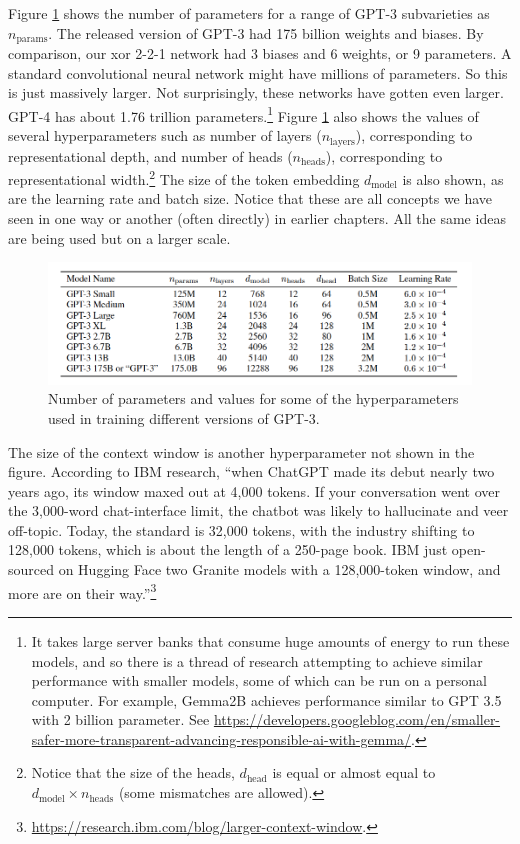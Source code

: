 Figure \ref{gptParams} shows the  number of parameters for a range of GPT-3 subvarieties as $n_\text{params}$. The released version of GPT-3 had 175 billion weights and biases. By comparison, our xor 2-2-1 network had 3 biases and 6 weights, or 9 parameters. A standard convolutional neural network might have millions of parameters. So this is just massively larger. Not surprisingly, these networks have gotten even larger. GPT-4 has about 1.76 trillion parameters.\footnote{It takes large server banks that  consume huge amounts of energy to run these models, and so there is a thread of research attempting to achieve similar performance with smaller models, some of which can be run on a  personal computer. For example, Gemma2B achieves performance similar to GPT 3.5 with 2 billion parameter. See \url{https://developers.googleblog.com/en/smaller-safer-more-transparent-advancing-responsible-ai-with-gemma/}.} Figure \ref{gptParams} also shows the values of several hyperparameters such as number of layers ($n_\text{layers}$), corresponding to representational depth, and number of heads ($n_\text{heads}$), corresponding to representational width.\footnote{Notice that the size of the heads, $d_\text{head}$ is equal or almost equal to  $d_\text{model} \times n_\text{heads}$ (some mismatches are allowed).} The size of the token embedding  $d_\text{model}$ is also shown, as are the learning rate and batch size. Notice that these are all concepts we have seen in one way or another (often directly) in earlier chapters. All the same ideas are being used but on a larger scale.

\begin{figure}[h]
\centering
\includegraphics[scale=.4]{./images/gpt3_params.png}
\caption[\url{https://arxiv.org/abs/2005.14165}.]{Number of parameters and values for some of the hyperparameters used in training different versions of GPT-3. }
\label{gptParams}
\end{figure}

The size of the context window is another hyperparameter not shown in the figure. According to IBM research, ``when ChatGPT made its debut nearly two years ago, its window maxed out at 4,000 tokens. If your conversation went over the 3,000-word chat-interface limit, the chatbot was likely to hallucinate and veer off-topic. Today, the standard is 32,000 tokens, with the industry shifting to 128,000 tokens, which is about the length of a 250-page book. IBM just open-sourced on Hugging Face two Granite models with a 128,000-token window, and more are on their way.''\footnote{\url{https://research.ibm.com/blog/larger-context-window}.}

